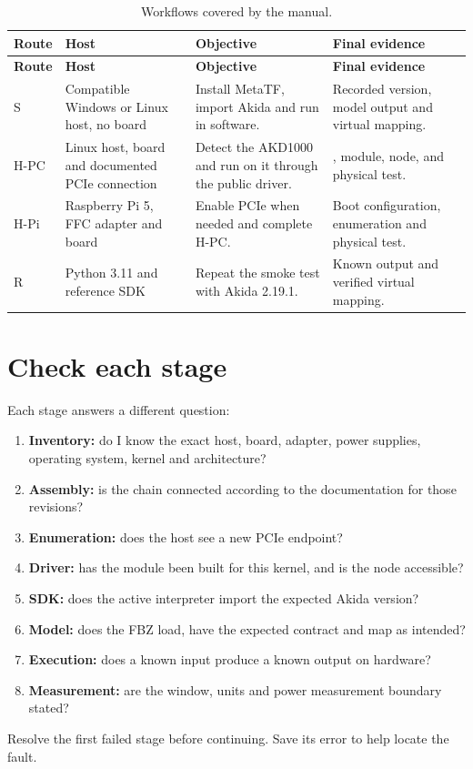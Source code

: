 \begin{longtable}{@{}L{0.12\textwidth}L{0.21\textwidth}L{0.29\textwidth}L{0.28\textwidth}@{}}
\caption{Workflows covered by the manual.}\label{tab:rutas}\\
\toprule
\textbf{Route} & \textbf{Host} & \textbf{Objective} & \textbf{Final evidence} \\
\midrule
\endfirsthead
\toprule
\textbf{Route} & \textbf{Host} & \textbf{Objective} & \textbf{Final evidence} \\
\midrule
\endhead
S & Compatible Windows or Linux host, no board & Install MetaTF, import Akida and run in software. & Recorded version, model output and virtual mapping. \\
H-PC & Linux host, board and documented PCIe connection & Detect the AKD1000 and run on it through the public driver. & , module, node,  and physical test. \\
H-Pi & Raspberry Pi 5, FFC adapter and board & Enable PCIe when needed and complete H-PC. & Boot configuration, enumeration and physical test. \\
R & Python 3.11 and reference SDK & Repeat the smoke test with Akida 2.19.1. & Known output and verified virtual mapping. \\
\bottomrule
\end{longtable}

\section{Check each stage}

Each stage answers a different question:

\begin{enumerate}[nosep]
  \item \textbf{Inventory:} do I know the exact host, board, adapter, power supplies,
        operating system, kernel and architecture?
  \item \textbf{Assembly:} is the chain connected according to the documentation for those revisions?
  \item \textbf{Enumeration:} does the host see a new PCIe endpoint?
  \item \textbf{Driver:} has the module been built for this kernel, and is the node accessible?
  \item \textbf{SDK:} does the active interpreter import the expected Akida version?
  \item \textbf{Model:} does the FBZ load, have the expected contract and map as intended?
  \item \textbf{Execution:} does a known input produce a known output on hardware?
  \item \textbf{Measurement:} are the window, units and power measurement boundary stated?
\end{enumerate}

Resolve the first failed stage before continuing. Save its error to help locate
the fault.
